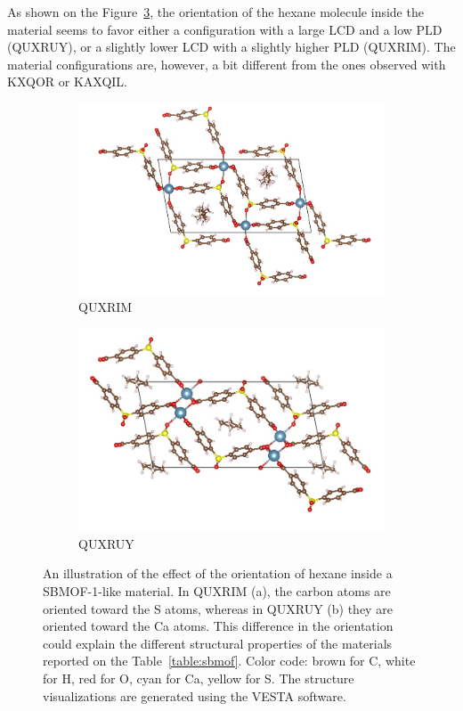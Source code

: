 \documentclass[main]{subfiles}
\begin{document}
As shown on the Figure~\ref{fgr:ads_config}, the orientation of the hexane molecule inside the material seems to favor either a configuration with a large LCD and a low PLD (QUXRUY), or a slightly lower LCD with a slightly higher PLD (QUXRIM). The material configurations are, however, a bit different from the ones observed with KXQOR or KAXQIL. 

\begin{figure}[ht]
  \centering
  \begin{subfigure}[b]{0.45\textwidth}
    \centering
    \includegraphics[height=0.6\textwidth]{figures/6-perspectives/QUXRIM.jpg}
    \caption{QUXRIM}\label{fgr:QUXRIM}
  \end{subfigure}
  \hfill
  \begin{subfigure}[b]{0.45\textwidth}
    \centering
    \includegraphics[height=0.6\textwidth]{figures/6-perspectives/QUXRUY.jpg}
    \caption{QUXRUY}\label{fgr:QUXRUY}
  \end{subfigure}
  \caption{ An illustration of the effect of the orientation of hexane inside a SBMOF-1-like material. In QUXRIM (a), the carbon atoms are oriented toward the S atoms, whereas in QUXRUY (b) they are oriented toward the Ca atoms. This difference in the orientation could explain the different structural properties of the materials reported on the Table~\ref{table:sbmof}. Color code: brown for C, white for H, red for O, cyan for Ca, yellow for S. The structure visualizations are generated using the VESTA software.\autocite{VESTA}}\label{fgr:ads_config}
\end{figure}
\end{document}
